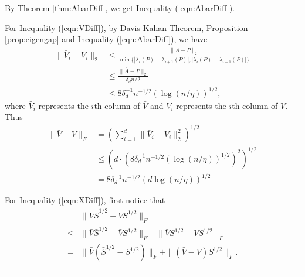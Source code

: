 \documentclass[a4paper]{article}
\newenvironment{proof}{{\bf Proof:  }}{\hfill\rule{2mm}{2mm}}
\begin{document}
\begin{proof}
By Theorem \ref{thm:AbarDiff}, we get Inequality (\ref{eqn:AbarDiff}).



For Inequality (\ref{eqn:VDiff}), by Davis-Kahan Theorem, Proposition \ref{prop:eigengap} and Inequality (\ref{eqn:AbarDiff}), we have
\begin{align*}
	\| \bar{V}_i - V_i \|_2
	& \le \frac{\|\bar{A} - P\|_2}{\min \{ |\lambda_i(P) - \lambda_{i+1}(P)|, |\lambda_i(P) - \lambda_{i-1}(P)| \}} \\
    & \le \frac{\|\bar{A} - P\|_2}{\delta_d n/2} \\
    & \le 8 \delta_d^{-1} n^{-1/2} (\log(n / \eta))^{1/2},
\end{align*}
where $\bar{V}_i$ represents the $i$th column of $\bar{V}$ and $V_i$ represents the $i$th column of $V$.
Thus
\begin{align*}
	\|\bar{V} - V\|_F & = \left( \sum_{i=1}^d \| \bar{V}_i - V_i \|_2^2 \right)^{1/2} \\
    & \le \left( d \cdot \left(8 \delta_d^{-1} n^{-1/2} (\log(n / \eta))^{1/2} \right)^2 \right)^{1/2} \\
    & = 8 \delta_d^{-1} n^{-1/2} (d \log(n / \eta))^{1/2}
\end{align*}



For Inequality (\ref{eqn:XDiff}), first notice that
\begin{align*}
	& \|\bar{V} \bar{S}^{1/2} - V S^{1/2} \|_F \\
    \le & \| \bar{V} \bar{S}^{1/2} - \bar{V} S^{1/2} \|_F + \| \bar{V} S^{1/2} - V S^{1/2} \|_F \\
    = & \| \bar{V} ( \bar{S}^{1/2} - S^{1/2} ) \|_F + \| ( \bar{V} - V) S^{1/2} \|_F.
\end{align*}


\end{proof}
\end{document}
